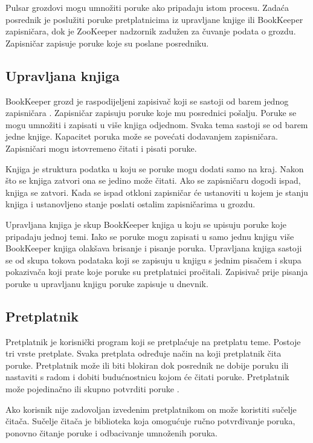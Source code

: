 \documentclass[utf8, diplomski, lmodern, numeric]{fer}
\begin{document}
Pulsar grozdovi mogu umnožiti poruke ako pripadaju istom procesu. Zadaća posrednik je poslužiti poruke pretplatnicima iz upravljane knjige ili BookKeeper zapisničara, dok je ZooKeeper nadzornik zadužen za čuvanje podata o grozdu. Zapisničar zapisuje poruke koje su poslane posredniku.

\subsection{Upravljana knjiga}
BookKeeper grozd je raspodijeljeni zapisivač koji se sastoji od barem jednog zapisničara . Zapisničar zapisuju poruke koje mu posrednici pošalju. Poruke se mogu umnožiti i zapisati u više knjiga odjednom. Svaka tema sastoji se od barem jedne knjige. Kapacitet poruka može se povećati dodavanjem zapisničara. Zapisničari mogu istovremeno čitati i pisati poruke.

Knjiga je struktura podatka u koju se poruke mogu dodati samo na kraj. Nakon što se knjiga zatvori ona se jedino može čitati. Ako se zapisničaru dogodi ispad, knjiga se zatvori. Kada se ispad otkloni zapisničar će ustanoviti u kojem je stanju knjiga i ustanovljeno stanje poslati ostalim zapisničarima u grozdu.

Upravljana knjiga \engl{} je skup BookKeeper knjiga u koju se upisuju poruke koje pripadaju jednoj temi. Iako se poruke mogu zapisati u samo jednu knjigu više BookKeeper knjiga olakšava brisanje i pisanje poruka. Upravljana knjiga sastoji se od skupa tokova podataka koji se zapisuju u knjigu s jednim pisačem i skupa pokazivača koji prate koje poruke su pretplatnici pročitali. Zapisivač prije pisanja poruke u upravljanu knjigu poruke zapisuje u dnevnik.

\subsection{Pretplatnik}
Pretplatnik je korisnički program koji se pretplaćuje na pretplatu teme. Postoje tri vrste pretplate. Svaka pretplata određuje način na koji pretplatnik čita poruke. Pretplatnik može ili biti blokiran dok posrednik ne dobije poruku ili nastaviti s radom i dobiti budućnostnicu  kojom će čitati poruke. Pretplatnik može pojedinačno ili skupno potvrditi poruke .

Ako korisnik nije zadovoljan izvedenim pretplatnikom on može koristiti sučelje čitača. Sučelje čitača je biblioteka koja omogućuje ručno potvrđivanje poruka, ponovno čitanje poruke i odbacivanje umnoženih poruka.
\end{document}
